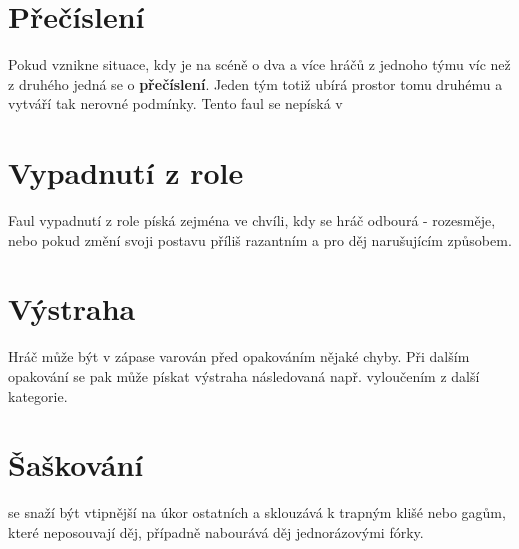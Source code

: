 \documentclass[main.tex]{subfiles}
\begin{document}
 
\needspace{5cm} \section{Přečíslení} \label{přečíslení}  
 
Pokud vznikne situace, kdy je na scéně o dva a více hráčů z jednoho týmu víc než z druhého jedná se o \textbf{přečíslení}{}. Jeden tým totiž ubírá prostor tomu druhému a vytváří tak nerovné podmínky. Tento faul se nepíská v  
 
 
\needspace{5cm} \section{Vypadnutí z role} \label{vypadnutí z role}  
 
Faul vypadnutí z role píská  zejména ve chvíli, kdy se hráč odbourá - rozesměje,  
nebo pokud změní svoji postavu příliš razantním a pro děj narušujícím způsobem. 
 
\needspace{5cm} \section{Výstraha} \label{výstraha}  
 
Hráč může být v zápase varován před opakováním nějaké chyby.  
Při dalším opakování se pak může pískat výstraha následovaná např. vyloučením z další kategorie. 
 
 
 
 
\needspace{5cm} \section{Šaškování} \label{šaškování}  
 
 se snaží být vtipnější na úkor ostatních a sklouzává k trapným klišé nebo gagům, které neposouvají děj, případně nabourává děj jednorázovými fórky. 
 
 
\end{document}
